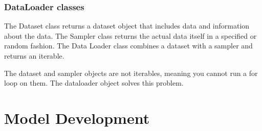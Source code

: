 \subsubsection{DataLoader classes}
The Dataset class returns a dataset object that includes data
and information about the data. The Sampler class returns the
actual data itself in a specified or random fashion. The Data
Loader class combines a dataset with a sampler and returns an
iterable.

The dataset and sampler objects are not iterables, meaning you
cannot run a for loop on them. The dataloader object solves
this problem.
\section{Model Development}
